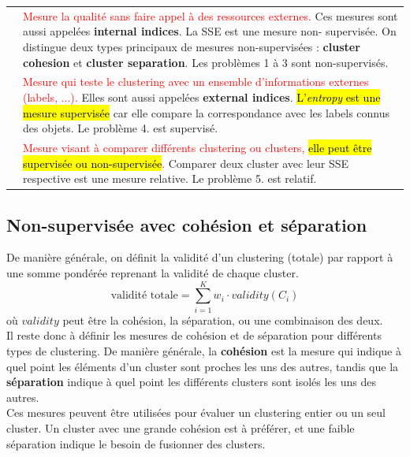 \documentclass[letterpaper, 12pt]{article}
\newcommand{\alinea}{
\hspace*{0.5cm}}
\newcommand{\red}[1]{
	\textcolor{red}{#1}}
\newcommand{\myul}[1]{
		\underline{\smash{#1}}
	}
\begin{document}
		\begin{tabular}{lp{14cm}}
			\myul{\textbf{\hl{Non-supervisé}}}	& 
				\red{Mesure la qualité sans faire appel à des
					 ressources externes.} Ces mesures sont aussi 
					 appelées \textbf{internal indices}.
					 La SSE est une mesure non-%
					 supervisée. On distingue deux types principaux
					 de mesures non-supervisées : \textbf{cluster cohesion}
					 et \textbf{cluster separation}. Les problèmes 
					 1 à 3 sont non-supervisés.\\
			\myul{\textbf{\hl{Supervisé}}}	&
				\red{Mesure qui teste le clustering avec un ensemble 
					 d'informations externes (labels, ...).} 
					 Elles sont aussi appelées \textbf{external indices}.
					\hl{ L'\textit{entropy} est une mesure supervisée} car
					 elle compare la correspondance avec les labels
					 connus des objets. Le problème 4. est supervisé.\\
			\myul{\textbf{\hl{Relatif}}} & 
				\red{Mesure visant à comparer différents clustering 
					 ou clusters, \hl{elle peut être 
					 supervisée ou non-supervisée}.} Comparer deux 
					 cluster avec leur SSE respective est une mesure
					 relative. Le problème 5. est relatif.
		\end{tabular}
		\subsection{Non-supervisée avec cohésion et séparation}
			\alinea De manière générale, on définit la validité d'un 
				clustering (totale) par rapport à une somme pondérée
				reprenant la validité de chaque cluster.
				$$ \text{validité totale} = \sum_{i=1}^{K} w_i\cdot
						 					   validity(C_i) $$
				où $validity$ peut être la cohésion, la séparation, 
				ou une combinaison des deux.\\ 
				Il reste donc à définir les mesures de cohésion et de
				séparation pour différents types de clustering.
				De manière générale, la \textbf{cohésion} est la
				mesure qui indique à quel point les éléments d'un
				cluster sont proches les uns des autres, tandis que
				la \textbf{séparation} indique à quel point
				les différents clusters sont isolés les uns des autres.\\
			\alinea Ces mesures peuvent être utilisées pour évaluer
				un clustering entier ou un seul cluster. Un cluster
				avec une grande cohésion est à préférer, et une faible
				séparation indique le besoin de fusionner des clusters.
\end{document}
